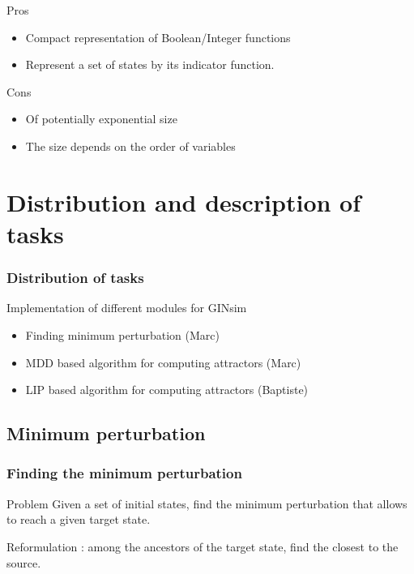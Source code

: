 \documentclass{beamer}
\begin{document}
\begin{frame}
  \begin{block}{Pros}
    \begin{itemize}
    \item Compact representation of Boolean/Integer functions
    \item Represent a set of states by its indicator function.
    \end{itemize}
  \end{block}
  
  \bigskip
  \begin{block}{Cons}
    \begin{itemize}
    \item Of potentially exponential size
    \item The size depends on the order of variables
    \end{itemize}
  \end{block}
\end{frame}



\section{Distribution and description of tasks}

\begin{frame}
  \frametitle{Distribution of tasks} 
  Implementation of different modules for GINsim
  \bigskip
  
  \begin{itemize}
  \item Finding minimum perturbation (Marc)
    \bigskip
    
  \item MDD based algorithm for computing attractors (Marc)
    \bigskip
    
  \item LIP based algorithm for computing attractors (Baptiste)
  \end{itemize}
\end{frame}


\subsection{Minimum perturbation}

\begin{frame}
  \frametitle{Finding the minimum perturbation}
  \begin{block}{Problem}
    Given a set of initial states, find the minimum perturbation that allows to reach a given target state.
    
    Reformulation : among the ancestors of the target state, find the closest to the source.
  \end{block}
\end{frame}
\end{document}
